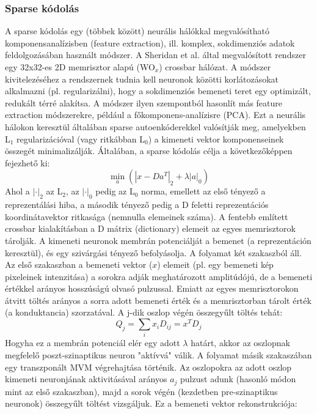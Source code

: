 \documentclass[twoside]{article}
\begin{document}
\subsubsection{Sparse kódolás}
A sparse kódolás egy (többek között) neurális hálókkal megvalósítható komponensanalízisben (feature extraction), ill. komplex, sokdimenziós adatok feldolgozásában használt módszer. A Sheridan et al. \cite{sheridan2017} által megvalósított rendszer egy 32x32-es 2D memrisztor alapú (WO$_x$) crossbar hálózat. A módszer kivitelezéséhez a rendszernek tudnia kell neuronok közötti korlátozásokat alkalmazni (pl. regularizálni), hogy a sokdimenziós bemeneti teret egy optimizált, redukált térré alakítsa. A módszer ilyen szempontból hasonlít más feature extraction módszerekre, például a főkomponens-analízisre (PCA). Ezt a neurális hálokon keresztül általában sparse autoenkóderekkel valósítják meg\cite{gao2024}, amelyekben L$_1$ regularizációval (vagy ritkábban L$_0$) a kimeneti vektor komponenseinek összegét minimalizálják. Általában, a sparse kódolás célja a következőképpen fejezhető ki:
\begin{equation}
	\min_a(|x-Da^T|_2 + \lambda|a|_0)
\end{equation}
Ahol a $|\cdot|_2$ az L$_2$, az $|\cdot|_0$ pedig az L$_0$ norma, emellett az első tényező a reprezentálási hiba, a második tényező pedig a D feletti reprezentációs koordinátavektor ritkasága (nemnulla elemeinek száma). A fentebb említett crossbar kialakításban a D mátrix (dictionary) elemeit az egyes memrisztorok tárolják. A kimeneti neuronok membrán potenciálját a bemenet (a reprezentáción keresztül), és egy szivárgási tényező befolyásolja. A folyamat két szakaszból áll. Az első szakaszban a bemeneti vektor ($x$) elemeit (pl. egy bemeneti kép pixeleinek intenzitása) a sorokra adják meghatározott amplitúdójú, de a bemeneti értékkel arányos hosszúságú olvasó pulzussal. Emiatt az egyes memrisztorokon átvitt töltés arányos a sorra adott bemeneti érték és a memrisztorban tárolt érték (a konduktancia) szorzatával. A j-dik oszlop végén összegyűlt töltés tehát:\begin{equation}
	Q_j = \sum_i x_i D_{ij} = x^T D_j
\end{equation}
Hogyha ez a membrán potenciál elér egy adott $\lambda$ határt, akkor az oszlopnak megfelelő poszt-szinaptikus neuron "aktívvá" válik. A folyamat másik szakaszában egy transzponált MVM végrehajtása történik. Az oszlopokra az adott oszlop kimeneti neuronjának aktivitásával arányos $a_j$ pulzust adunk (hasonló módon mint az első szakaszban), majd a sorok végén (kezdetben pre-szinaptikus neuronok) összegyűlt töltést vizsgáljuk. Ez a bemeneti vektor rekonstrukciója:
\end{document}
